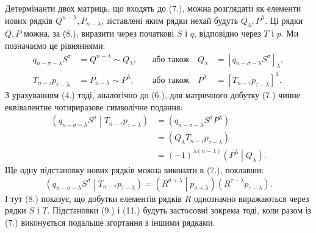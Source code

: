 \documentclass[11pt]{article}
\newcommand{\pair}[2]{\left(#1\middle|#2\right)}
\begin{document}
Детермінанти двох матриць, що входять до (7.), можна розглядати як елементи нових рядків $Q^{n-\lambda},P_{n-\lambda}$, зіставлені яким рядки нехай будуть $Q_\lambda,P^\lambda$. Ці рядки $Q,P$ можна, за (8.), виразити через початкові $S$ і $q$, відповідно через $T$ і $p$. Ми позначаємо це рівняннями:
\begin{equation}
\begin{aligned}
 q_{n-\sigma-\lambda}S^\sigma&=Q^{n-\lambda}\sim Q_\lambda,
 &\quad\text{або також}\quad Q_\lambda&=[q_{n-\sigma-\lambda}S^\sigma]_\lambda,\\
 T_{n-\tau}p_{\tau-\lambda}&=P_{n-\lambda}\sim P^\lambda,
 &\quad\text{або також}\quad P^\lambda&=[T_{n-\tau}p_{\tau-\lambda}]^\lambda.
\end{aligned}
\tag{9}
\end{equation}
З урахуванням (4.) тоді, аналогічно до (6.), для матричного добутку (7.) чинне еквівалентне чотириразове символічне подання:
\begin{equation}
\begin{aligned}
\pair{q_{n-\sigma-\lambda}S^\sigma}{T_{n-\tau}p_{\tau-\lambda}}
&=(q_{n-\sigma-\lambda}S^\sigma P^\lambda)\\
&=(Q_\lambda T_{n-\tau}p_{\tau-\lambda})\\
&=(-1)^{\lambda(n-\lambda)}\pair{P^\lambda}{Q_\lambda}.
\end{aligned}
\tag{10}
\end{equation}
Ще одну підстановку нових рядків можна виконати в (7.), поклавши:
\begin{equation}
 \pair{q_{n-\sigma-\lambda}S^\sigma}{T_{n-\tau}p_{\tau-\lambda}}
 =\pair{R^{\sigma+\lambda}}{p_{\sigma+\lambda}}(R^{\tau-\lambda}p_{\tau-\lambda}).
\tag{11}
\end{equation}
І тут (8.) показує, що добутки елементів рядків $R$ однозначно виражаються через рядки $S$ і $T$. Підстановки (9.) і (11.) будуть застосовні зокрема тоді, коли разом із (7.) виконується подальше згортання з іншими рядками.
\end{document}
